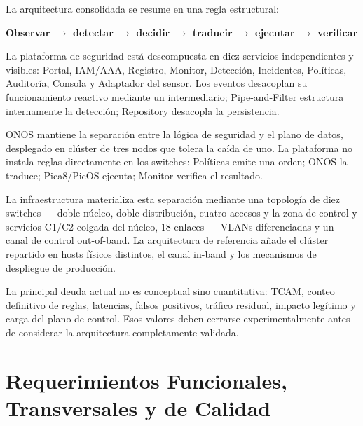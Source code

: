 \documentclass[11pt,a4paper]{report}
\begin{document}
La arquitectura consolidada se resume en una regla estructural:

\begin{center}
\Large\bfseries
Observar \(\rightarrow\) detectar \(\rightarrow\) decidir \(\rightarrow\) traducir \(\rightarrow\) ejecutar \(\rightarrow\) verificar
\end{center}

La plataforma de seguridad está descompuesta en diez servicios independientes y visibles: Portal, IAM/AAA, Registro, Monitor, Detección, Incidentes, Políticas, Auditoría, Consola y Adaptador del sensor. Los eventos desacoplan su funcionamiento reactivo mediante un intermediario; Pipe-and-Filter estructura internamente la detección; Repository desacopla la persistencia.

ONOS mantiene la separación entre la lógica de seguridad y el plano de datos, desplegado en clúster de tres nodos que tolera la caída de uno. La plataforma no instala reglas directamente en los switches: Políticas emite una orden; ONOS la traduce; Pica8/PicOS ejecuta; Monitor verifica el resultado.

La infraestructura materializa esta separación mediante una topología de diez switches — doble núcleo, doble distribución, cuatro accesos y la zona de control y servicios C1/C2 colgada del núcleo, 18 enlaces — VLANs diferenciadas y un canal de control out-of-band. La arquitectura de referencia añade el clúster repartido en hosts físicos distintos, el canal in-band y los mecanismos de despliegue de producción.

La principal deuda actual no es conceptual sino cuantitativa: TCAM, conteo definitivo de reglas, latencias, falsos positivos, tráfico residual, impacto legítimo y carga del plano de control. Esos valores deben cerrarse experimentalmente antes de considerar la arquitectura completamente validada.

\appendix

\chapter{Requerimientos Funcionales, Transversales y de Calidad}
\end{document}
